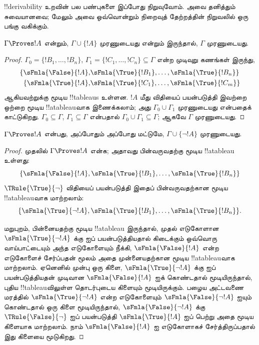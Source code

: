 \documentclass[../../../include/open-logic-section]{subfiles}
\begin{document}
      {}
      {}


!!{derivability} உறவின் பல பண்புகளை இப்போது நிறுவுவோம். அவை தனித்தும்
சுவையானவை; மேலும் அவை ஒவ்வொன்றும் நிறைவுத் தேற்றத்தின் நிறுவலில் ஒரு பங்கு
வகிக்கும்.

\begin{prop}
  $\Gamma \Proves !A$ என்றும், $\Gamma \cup \{!A\}$ முரணுடையது என்றும்
  இருந்தால், $\Gamma$ முரணுடையது.
\end{prop}

\begin{proof}
$\Gamma_0 = \{!B_1, \dots, !B_n\}$, $\Gamma_1
  =\{!C_1, \dots, !C_n\} \subseteq \Gamma$ என்ற முடிவுறு கணங்கள் இருந்து,
  \begin{align*}
    \{\sFmla{\False}{!A}, &
    \sFmla{\True}{!B_1}, \dots, \sFmla{\True}{!B_n}\} \\
    \{\sFmla{\True}{!A}, &
    \sFmla{\True}{!C_1}, \dots, \sFmla{\True}{!C_m}\}
  \end{align*}
  ஆகியவற்றுக்கு மூடிய !!{tableau}s உள்ளன. $!A$ மீது \Cut{} விதியைப்
  பயன்படுத்தி இவற்றை ஒற்றை மூடிய !!a{tableau}வாக இணைக்கலாம்; அது $\Gamma_0
  \cup \Gamma_1$ முரணுடையது என்பதைக் காட்டுகிறது. $\Gamma_0
  \subseteq \Gamma$, $\Gamma_1 \subseteq \Gamma$ என்பதால் $\Gamma_0 \cup
  \Gamma_1 \subseteq \Gamma$; ஆகவே $\Gamma$ முரணுடையது.
\end{proof}

\begin{prop}
$\Gamma \Proves !A$ என்பது, அப்போதும் அப்போது மட்டுமே, $\Gamma \cup
\{\lnot !A\}$ முரணுடையது.
\end{prop}

\begin{proof}
முதலில் $\Gamma \Proves !A$ என்க; அதாவது பின்வருவதற்கு மூடிய
!!a{tableau} உள்ளது:
\[
\{\sFmla{\False}{!A},
\sFmla{\True}{!B_1}, \dots, \sFmla{\True}{!B_n}\}
\]
$\TRule{\True}{\lnot}$ விதியைப் பயன்படுத்தி இதைப் பின்வருவதற்கான மூடிய
!!a{tableau}வாக மாற்றலாம்:
\[
\{\sFmla{\True}{\lnot !A},
\sFmla{\True}{!B_1}, \dots, \sFmla{\True}{!B_n}\}.
\]

மறுபுறம், பின்னையதற்கு மூடிய !!a{tableau} இருந்தால், முதல் எடுகோளான
$\sFmla{\True}{\lnot !A}$ க்கு \TRule{\True}{\lnot} ஐப் பயன்படுத்தியதால்
கிடைக்கும் ஒவ்வொரு வாய்பாட்டையும் அந்த எடுகோளையும் நீக்கி,
$\sFmla{\False}{!A}$ என்ற எடுகோளைச் சேர்ப்பதன் மூலம் அதை முன்னையதற்கான மூடிய
!!a{tableau}வாக மாற்றலாம். ஏனெனில் முன்பு ஒரு கிளை,
$\sFmla{\True}{\lnot !A}$ க்கு \TRule{\True}{\lnot} ஐப் பயன்படுத்தியதன்
முடிவான $\sFmla{\False}{!A}$ ஐக் கொண்டதால் மூடியிருந்தால், புதிய
!!{tableau}விலுள்ள தொடர்புடைய கிளையும் மூடியிருக்கும். பழைய அட்டவணை மரத்தில்
$\sFmla{\True}{\lnot !A}$ என்ற எடுகோளையும் $\sFmla{\False}{\lnot !A}$ ஐயும்
கொண்டதால் ஒரு கிளை மூடியிருந்தால், $\sFmla{\False}{\lnot !A}$ க்கு
$\TRule{\False}{\lnot}$ ஐப் பயன்படுத்தி $\sFmla{\True}{!A}$ ஐப் பெற்று அதை
மூடிய கிளையாக மாற்றலாம். நாம் $\sFmla{\False}{!A}$ ஐ எடுகோளாகச்
சேர்த்திருப்பதால் இது கிளையை மூடுகிறது.
\end{proof}
\end{document}
